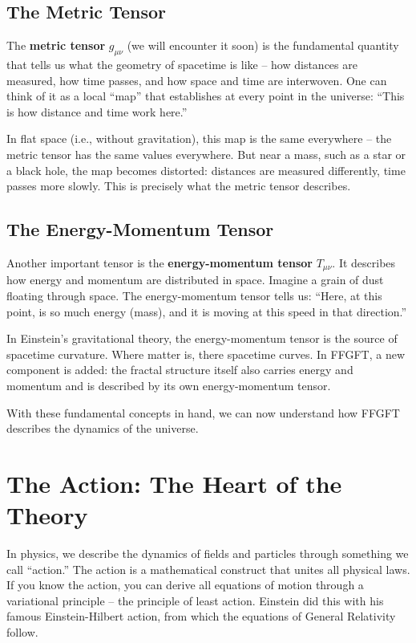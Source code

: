 \subsection{The Metric Tensor}

The \textbf{metric tensor} $g_{\mu\nu}$ (we will encounter it soon) is the fundamental quantity that tells us what the geometry of spacetime is like -- how distances are measured, how time passes, and how space and time are interwoven. One can think of it as a local ``map'' that establishes at every point in the universe: ``This is how distance and time work here.''

In flat space (i.e., without gravitation), this map is the same everywhere -- the metric tensor has the same values everywhere. But near a mass, such as a star or a black hole, the map becomes distorted: distances are measured differently, time passes more slowly. This is precisely what the metric tensor describes.

\subsection{The Energy-Momentum Tensor}

Another important tensor is the \textbf{energy-momentum tensor} $T_{\mu\nu}$. It describes how energy and momentum are distributed in space. Imagine a grain of dust floating through space. The energy-momentum tensor tells us: ``Here, at this point, is so much energy (mass), and it is moving at this speed in that direction.''

In Einstein's gravitational theory, the energy-momentum tensor is the source of spacetime curvature. Where matter is, there spacetime curves. In FFGFT, a new component is added: the fractal structure itself also carries energy and momentum and is described by its own energy-momentum tensor.

With these fundamental concepts in hand, we can now understand how FFGFT describes the dynamics of the universe.

\section{The Action: The Heart of the Theory}

In physics, we describe the dynamics of fields and particles through something we call ``action.'' The action is a mathematical construct that unites all physical laws. If you know the action, you can derive all equations of motion through a variational principle -- the principle of least action. Einstein did this with his famous Einstein-Hilbert action, from which the equations of General Relativity follow.

